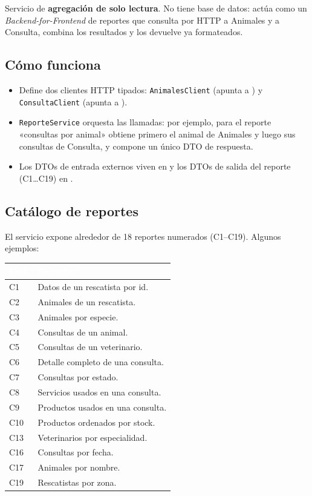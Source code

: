 \documentclass[11pt,a4paper]{article}
\begin{document}
Servicio de \textbf{agregación de solo lectura}. No tiene base de datos: actúa como
un \emph{Backend-for-Frontend} de reportes que consulta por HTTP a Animales y a
Consulta, combina los resultados y los devuelve ya formateados.

\subsection{Cómo funciona}
\begin{itemize}[leftmargin=1.4em]
  \item Define dos clientes HTTP tipados: \texttt{AnimalesClient} (apunta a
        ) y \texttt{ConsultaClient} (apunta a ).
  \item \texttt{ReporteService} orquesta las llamadas: por ejemplo, para el reporte
        «consultas por animal» obtiene primero el animal de Animales y luego sus
        consultas de Consulta, y compone un único DTO de respuesta.
  \item Los DTOs de entrada externos viven en  y los DTOs de
        salida del reporte (C1\ldots C19) en .
\end{itemize}

\subsection{Catálogo de reportes}
El servicio expone alrededor de 18 reportes numerados (C1--C19). Algunos ejemplos:

\begin{center}
\begin{tabular}{>{\ttfamily\small}l p{10.5cm}}
\toprule
\rowcolor{moss}\textcolor{white}{\textbf{Cód.}} & \textcolor{white}{\textbf{Reporte}} \\
\midrule
C1  & Datos de un rescatista por id. \\
C2  & Animales de un rescatista. \\
C3  & Animales por especie. \\
C4  & Consultas de un animal. \\
C5  & Consultas de un veterinario. \\
C6  & Detalle completo de una consulta. \\
C7  & Consultas por estado. \\
C8  & Servicios usados en una consulta. \\
C9  & Productos usados en una consulta. \\
C10 & Productos ordenados por stock. \\
C13 & Veterinarios por especialidad. \\
C16 & Consultas por fecha. \\
C17 & Animales por nombre. \\
C19 & Rescatistas por zona. \\
\bottomrule
\end{tabular}
\end{center}
\end{document}
